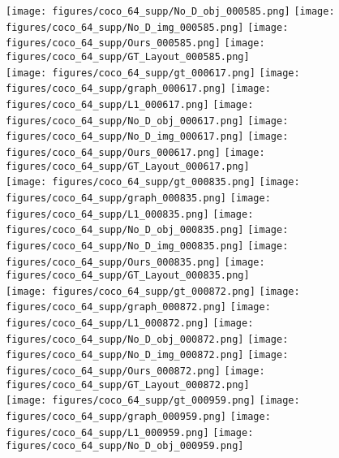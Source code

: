 \documentclass[10pt,twocolumn,letterpaper]{article}
\begin{document}
\begin{figure*}
  \texttt{[image: figures/coco\_64\_supp/No\_D\_obj\_000585.png]}
  \texttt{[image: figures/coco\_64\_supp/No\_D\_img\_000585.png]}
  \texttt{[image: figures/coco\_64\_supp/Ours\_000585.png]}
  \texttt{[image: figures/coco\_64\_supp/GT\_Layout\_000585.png]} \\
  \texttt{[image: figures/coco\_64\_supp/gt\_000617.png]}
  \texttt{[image: figures/coco\_64\_supp/graph\_000617.png]}
  \texttt{[image: figures/coco\_64\_supp/L1\_000617.png]}
  \texttt{[image: figures/coco\_64\_supp/No\_D\_obj\_000617.png]}
  \texttt{[image: figures/coco\_64\_supp/No\_D\_img\_000617.png]}
  \texttt{[image: figures/coco\_64\_supp/Ours\_000617.png]}
  \texttt{[image: figures/coco\_64\_supp/GT\_Layout\_000617.png]} \\
  \texttt{[image: figures/coco\_64\_supp/gt\_000835.png]}
  \hspace*{1.8mm}\texttt{[image: figures/coco\_64\_supp/graph\_000835.png]}\hspace*{1.8mm}
  \texttt{[image: figures/coco\_64\_supp/L1\_000835.png]}
  \texttt{[image: figures/coco\_64\_supp/No\_D\_obj\_000835.png]}
  \texttt{[image: figures/coco\_64\_supp/No\_D\_img\_000835.png]}
  \texttt{[image: figures/coco\_64\_supp/Ours\_000835.png]}
  \texttt{[image: figures/coco\_64\_supp/GT\_Layout\_000835.png]} \\
  \texttt{[image: figures/coco\_64\_supp/gt\_000872.png]}
  \hspace*{5.2mm}\texttt{[image: figures/coco\_64\_supp/graph\_000872.png]}\hspace*{5.2mm}
  \texttt{[image: figures/coco\_64\_supp/L1\_000872.png]}
  \texttt{[image: figures/coco\_64\_supp/No\_D\_obj\_000872.png]}
  \texttt{[image: figures/coco\_64\_supp/No\_D\_img\_000872.png]}
  \texttt{[image: figures/coco\_64\_supp/Ours\_000872.png]}
  \texttt{[image: figures/coco\_64\_supp/GT\_Layout\_000872.png]} \\
  \texttt{[image: figures/coco\_64\_supp/gt\_000959.png]}
  \texttt{[image: figures/coco\_64\_supp/graph\_000959.png]}
  \texttt{[image: figures/coco\_64\_supp/L1\_000959.png]}
  \texttt{[image: figures/coco\_64\_supp/No\_D\_obj\_000959.png]}

\end{figure*}
\end{document}
